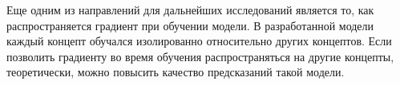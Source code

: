 Еще одним из направлений для дальнейших исследований является то,
как распространяется градиент при обучении модели. В разработанной
модели каждый концепт обучался изолированно относительно других концептов.
Если позволить градиенту во время обучения распространяться на другие
концепты, теоретически, можно повысить качество предсказаний такой модели.

